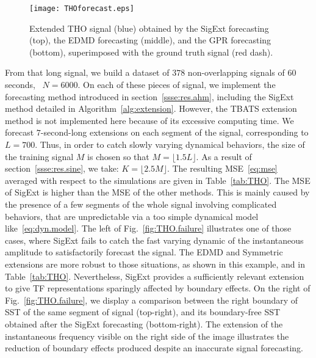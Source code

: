 \begin{figure}
\texttt{[image: THOforecast.eps]}
\caption{Extended THO signal (blue) obtained by the {\sf SigExt} forecasting (top), the EDMD forecasting (middle), and the GPR forecasting (bottom), superimposed with the ground truth signal (red dash).}
\label{fig:tho}
\end{figure}

From that long signal, we build a dataset of $378$ non-overlapping signals of 60 seconds, \ie~$N=6000$. On each of these pieces of signal, we implement the forecasting method introduced in section~\ref{ssse:res.ahm}, including the {\sf SigExt} method detailed in Algorithm~\ref{alg:extension}. However, the TBATS extension method is not implemented here because of its excessive computing time. We forecast $7$-second-long extensions on each segment of the signal, corresponding to $L =700$. Thus, in order to catch slowly varying dynamical behaviors, the size of the training signal $M$ is chosen so that $M=\lfloor 1.5L\rfloor$. As a result of section~\ref{ssse:res.sine}, we take: $K=\lfloor2.5M\rfloor$. The resulting MSE~\eqref{eq:mse} averaged with respect to the simulations are given in Table~\ref{tab:THO}. The MSE of {\sf SigExt} is higher than the MSE of the other methods. This is mainly caused by the presence of a few segments of the whole signal involving complicated behaviors, that are unpredictable via a too simple dynamical model like~\eqref{eq:dyn.model}. The left of Fig.~\ref{fig:THO.failure} illustrates one of those cases, where {\sf SigExt} fails to catch the fast varying dynamic of the instantaneous amplitude to satisfactorily forecast the signal. The EDMD and Symmetric extensions are more robust to those situations, as shown in this example, and in Table~\ref{tab:THO}. Nevertheless, {\sf SigExt} provides a sufficiently relevant extension to give TF representations sparingly affected by boundary effects. On the right of Fig.~\ref{fig:THO.failure}, we display a comparison between the right boundary of SST of the same segment of signal (top-right), and its boundary-free SST obtained after the {\sf SigExt} forecasting (bottom-right). The extension of the instantaneous frequency visible on the right side of the image illustrates the reduction of boundary effects produced despite an inaccurate signal forecasting.

